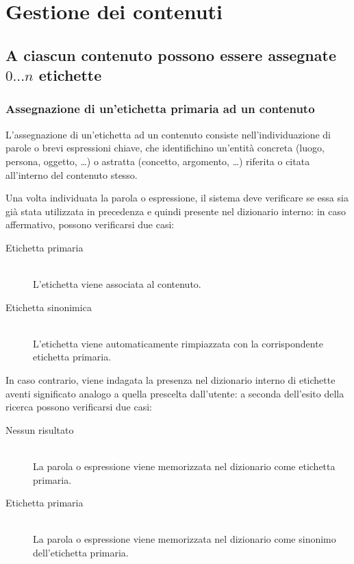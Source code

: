 \documentclass[10pt,a4paper,headinclude,footinclude,hidelinks]{scrreprt} %
\begin{document}
	\section{Gestione dei contenuti} %
	
	\subsection[Assegnazione etichette]{A ciascun contenuto possono essere assegnate $0...n$ etichette}
	\subsubsection{Assegnazione di un'etichetta primaria ad un contenuto}
	L'assegnazione di un'etichetta ad un contenuto consiste nell'individuazione di parole o brevi espressioni chiave, che identifichino un'entità concreta (luogo, persona, oggetto, \ldots) o astratta (concetto, argomento, \ldots) riferita o citata all'interno del contenuto stesso.
	
	Una volta individuata la parola o espressione, il sistema deve verificare se essa sia già stata utilizzata in precedenza e quindi presente nel dizionario interno: in caso affermativo, possono verificarsi due casi:
	\begin{description}
	\item[Etichetta primaria] \hfill \\
	L'etichetta viene associata al contenuto.
	\item[Etichetta sinonimica] \hfill \\
	L'etichetta viene automaticamente rimpiazzata con la corrispondente etichetta primaria.
	\end{description}

	In caso contrario, viene indagata la presenza nel dizionario interno di etichette aventi significato analogo a quella prescelta dall'utente: a seconda dell'esito della ricerca possono verificarsi due casi:
	\begin{description}
	\item[Nessun risultato] \hfill \\
	La parola o espressione viene memorizzata nel dizionario come etichetta primaria.
	\item[Etichetta primaria] \hfill \\
	La parola o espressione viene memorizzata nel dizionario come sinonimo dell'etichetta primaria.
	\end{description}
\end{document}
